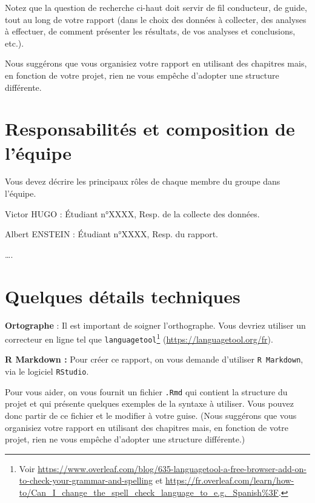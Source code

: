 \documentclass[mstat,12pt]{unswthesis}
\begin{document}
\medskip

Notez que la question de recherche ci-haut doit servir de fil
conducteur, de guide, tout au long de votre rapport (dans le choix des
données à collecter, des analyses à effectuer, de comment présenter les
résultats, de vos analyses et conclusions, etc.).

\medskip

Nous suggérons que vous organisiez votre rapport en utilisant des
chapitres mais, en fonction de votre projet, rien ne vous empêche
d'adopter une structure différente.

\section{Responsabilités et composition de
l'équipe}\label{responsabilituxe9s-et-composition-de-luxe9quipe}

Vous devez décrire les principaux rôles de chaque membre du groupe dans
l'équipe.

\medskip

Victor HUGO : Étudiant n°XXXX, Resp. de la collecte des données.

Albert ENSTEIN : Étudiant n°XXXX, Resp. du rapport.

\ldots.

\section{Quelques détails
techniques}\label{quelques-duxe9tails-techniques}

\textbf{Ortographe} : Il est important de soigner l'orthographe. Vous
devriez utiliser un correcteur en ligne tel que
\texttt{languagetool}\footnote{Voir \href{https://www.overleaf.com/blog/635-languagetool-a-free-browser-add-on-to-check-your-grammar-and-spelling}{https://www.overleaf.com/blog/635-languagetool-a-free-browser-add-on-to-check-your-grammar-and-spelling} et \url{https://fr.overleaf.com/learn/how-to/Can_I_change_the_spell_check_language_to_e.g._Spanish\%3F}.}
(\url{https://languagetool.org/fr}).

\bigskip

\textbf{R Markdown :} Pour créer ce rapport, on vous demande d'utiliser
\texttt{R\ Markdown}, via le logiciel \texttt{RStudio}.

Pour vous aider, on vous fournit un fichier \texttt{.Rmd} qui contient
la structure du projet et qui présente quelques exemples de la syntaxe à
utiliser. Vous pouvez donc partir de ce fichier et le modifier à votre
guise. (Nous suggérons que vous organisiez votre rapport en utilisant
des chapitres mais, en fonction de votre projet, rien ne vous empêche
d'adopter une structure différente.)
\end{document}
